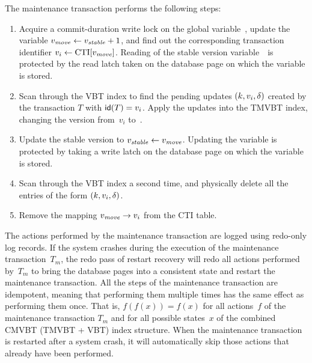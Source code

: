 The maintenance transaction performs the following steps:
\begin{enumerate}
\setlength{\itemsep}{0pt}

\item 
\label{maintenance:movever} 
Acquire a commit-duration write lock on the global variable~\movever, update
the variable $\smash{v_{\text{\textit{move}}}} \gets \smash{v_{\text{\textit{stable}}}} + 1$, and find out the
corresponding transaction identifier $v_i \gets \text{CTI}[\smash{v_{\text{\textit{move}}}}]$.
Reading of the stable version variable~\stablever\ is protected by 
the read latch taken on the database page on which the variable is 
stored.

\item
\label{maintenance:copy} 
Scan through the VBT index to find the pending updates $(k, v_i,
\delta)$ created by the transaction $T$ with $\text{\textsf{id}}(T) = v_i$.
Apply the updates into the TMVBT index, changing the version
from~$v_i$ to~\movever.

\item 
\label{maintenance:stablever} 
Update the stable version to $\smash{v_{\text{\textit{stable}}}} \gets \smash{v_{\text{\textit{move}}}}$.
Updating the variable is protected by taking a write latch on the database
page on which the variable is stored. 

\item 
\label{maintenance:delete} 
Scan through the VBT index a second time, and physically delete all the
entries of the form $(k, v_i, \delta)$.

\item 
\label{maintenance:finish} 
Remove the mapping $\smash{v_{\text{\textit{move}}}} \to v_i$ from the CTI table.

\end{enumerate}

The actions performed by the maintenance transaction are logged using
redo-only log records. 
If the system crashes during the execution of the maintenance
transaction~$T_m$, the redo pass of restart recovery will redo all
actions performed by~$T_m$ to bring the database pages into a consistent
state and restart the maintenance transaction.
All the steps of the maintenance transaction are idempotent, meaning that
performing them multiple times has the same effect as performing them once. 
That is, $f(f(x)) = f(x)$ for all actions~$f$ of the maintenance
transaction $T_m$ and for all possible states~$x$ of the combined CMVBT
(TMVBT + VBT) index structure.
When the maintenance transaction is restarted after a system crash, it will
automatically skip those actions that already have been performed.


